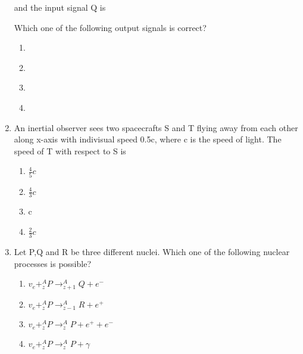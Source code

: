 \documentclass[journal,12pt,onecolumn]{IEEEtran}
\theoremstyle{remark}
\begin{document}
\begin{enumerate}
\begin{figure}[!ht]
{
}%
\end{figure}
and the input signal Q is\\ 
\begin{figure}[!ht]
\centering
\resizebox{0.2\textwidth}{!}{%

}%
\end{figure}
Which one of the following output signals is correct?\\
\begin{enumerate}
\item \begin{figure}[!ht]
\centering
\resizebox{0.2\textwidth}{!}{%

}%
\end{figure}
\item \begin{figure}[!ht]
\centering
\resizebox{0.2\textwidth}{!}{%

}%
\end{figure}
\item \begin{figure}[!ht]
\centering
\resizebox{0.2\textwidth}{!}{%

}%
\end{figure}
\item \begin{figure}[!ht]
\centering
\resizebox{0.2\textwidth}{!}{%

}%
\end{figure}
\end{enumerate}
\item An inertial observer sees two spacecrafts S and T flying away from each other along x-axis with indivisual speed 0.5c, where c is the speed of light. The speed of T with respect to S is
\begin{enumerate}
    \item $\frac{4}{5}c$
    \item $\frac{4}{3}c$
    \item c
    \item $\frac{2}{3}c$
\end{enumerate}
\item Let P,Q and R be three different nuclei. Which one of the following nuclear processes is possible?
\begin{enumerate}
    \item $v_e+^{A}_{z}P \rightarrow ^{A}_{z+1}Q+e^-$
     \item $v_e+^{A}_{z}P \rightarrow ^{A}_{z-1}R+e^+$
      \item $v_e+^{A}_{z}P \rightarrow ^{A}_{z}P+e^++e^-$
    \item $v_e+^{A}_{z}P \rightarrow ^{A}_{z}P+\gamma$   
\end{enumerate}

\end{enumerate}
\end{document}
